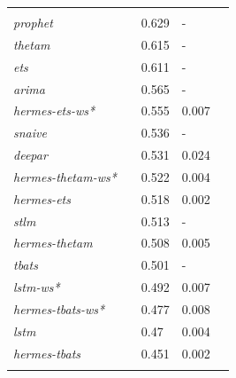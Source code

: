\documentclass[10pt]{article} %
\begin{document}
\begin{table}
{\begin{tabular}{l||llll}
	 &&& \\
     \textit{prophet} && 0.629 & -\\ 
	 \textit{thetam} && 0.615 & -\\ 
	 \textit{ets} && 0.611 & -\\ 
	 \textit{arima} && 0.565 & -\\ 
	 \textit{hermes-ets-ws*} && 0.555 & 0.007\\ 
	 \textit{snaive} && 0.536 & -\\  
	 \textit{deepar} && 0.531 & 0.024\\ 
 	 \textit{hermes-thetam-ws*} && 0.522 & 0.004\\ 
	 \textit{hermes-ets} && 0.518 & 0.002\\ 
	 \textit{stlm} && 0.513 & -\\ 
	 \textit{hermes-thetam} && 0.508 & 0.005\\ 
	 \textit{tbats} && 0.501 & -\\ 
	 \textit{lstm-ws*} && 0.492 & 0.007\\ 
	 \textit{hermes-tbats-ws*} && 0.477 & 0.008\\ 
	 \textit{lstm} && 0.47 & 0.004\\ 
	 \textit{hermes-tbats} && 0.451 & 0.002\\  \vspace{0.5cm}\\
  \end{tabular}
 }
\end{table}
\end{document}
